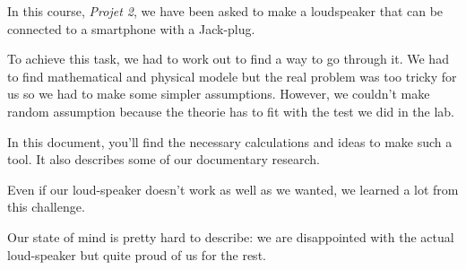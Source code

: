

\begin{abstract-en}


In this course, \textit{Projet 2}, we have been asked to make a loudspeaker that can be connected to a smartphone with a Jack-plug.

To achieve this task, we had to work out to find a way to go through it.
We had to find mathematical and physical modele but the real problem was too tricky for us so we had to make some simpler assumptions.
However, we couldn't make random assumption because the theorie has to fit with the test we did in the lab.

In this document, you'll find the necessary calculations and ideas to make such a tool. It also describes some
of our documentary research.

Even if our loud-speaker doesn't work as well as we wanted, we learned a lot from this challenge. 

Our state of mind is pretty hard to describe: we are disappointed with the actual loud-speaker but quite proud of us for the rest.


\end{abstract-en}


